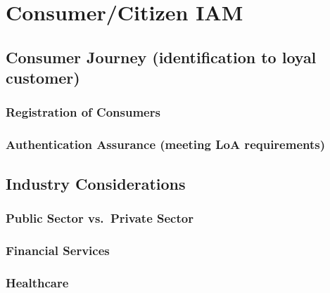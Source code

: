 \hypertarget{consumercitizen-iam-1}{%
\chapter{Consumer/Citizen IAM}\label{consumercitizen-iam-1}}

\hypertarget{consumer-journey-identification-to-loyal-customer}{%
\section{Consumer Journey (identification to loyal
customer)}\label{consumer-journey-identification-to-loyal-customer}}

\hypertarget{registration-of-consumers}{%
\subsection{Registration of
Consumers}\label{registration-of-consumers}}

\hypertarget{authentication-assurance-meeting-loa-requirements}{%
\subsection{Authentication Assurance (meeting LoA
requirements)}\label{authentication-assurance-meeting-loa-requirements}}

\hypertarget{industry-considerations}{%
\section{Industry Considerations}\label{industry-considerations}}

\hypertarget{public-sector-vs.-private-sector}{%
\subsection{Public Sector vs.~Private
Sector}\label{public-sector-vs.-private-sector}}

\hypertarget{financial-services}{%
\subsection{Financial Services}\label{financial-services}}

\hypertarget{healthcare}{%
\subsection{Healthcare}\label{healthcare}}

